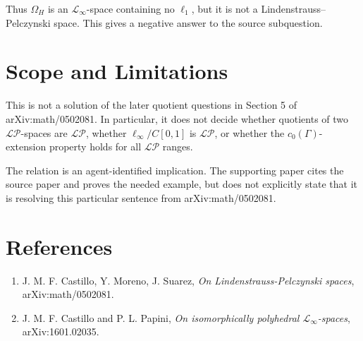 \documentclass[11pt]{article}
\newcommand{\LP}{\mathcal{LP}}
\begin{document}
Thus \(\Omega_H\) is an \(\mathcal L_\infty\)-space containing no
\(\ell_1\), but it is not a Lindenstrauss--Pelczynski space. This gives a
negative answer to the source subquestion.

\section*{Scope and Limitations}

This is not a solution of the later quotient questions in Section 5 of
arXiv:math/0502081. In particular, it does not decide whether quotients of two
\(\LP\)-spaces are \(\LP\), whether \(\ell_\infty/C[0,1]\) is \(\LP\), or
whether the \(c_0(\Gamma)\)-extension property holds for all \(\LP\) ranges.

The relation is an agent-identified implication. The supporting paper cites
the source paper and proves the needed example, but does not explicitly state
that it is resolving this particular sentence from arXiv:math/0502081.

\section*{References}

\begin{enumerate}
\item J. M. F. Castillo, Y. Moreno, J. Suarez, \emph{On
Lindenstrauss-Pelczynski spaces}, arXiv:math/0502081.
\item J. M. F. Castillo and P. L. Papini, \emph{On isomorphically polyhedral
\(\mathcal L_\infty\)-spaces}, arXiv:1601.02035.
\end{enumerate}
\end{document}
